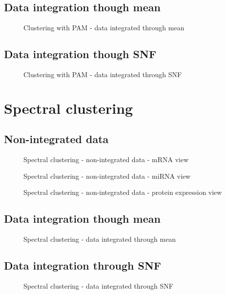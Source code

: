 \subsection{Data integration though mean}\label{pam_mean}
\begin{figure}\label{fig:pam_mean}
    \centering
    \caption{Clustering with PAM - data integrated through mean}
\end{figure}

\subsection{Data integration though SNF}\label{pam_SNF}
\begin{figure}\label{fig:pam_SNF}
    \centering
    \caption{Clustering with PAM - data integrated through SNF}
\end{figure}

\section{Spectral clustering}\label{results_sc}
\subsection{Non-integrated data}\label{sc_nonIntegrated}
\begin{figure}\label{fig:sc_1}
    \centering
    \caption{Spectral clustering - non-integrated data - mRNA view}
\end{figure}
\begin{figure}\label{fig:sc_2}
    \centering
    \caption{Spectral clustering - non-integrated data - miRNA view}
\end{figure}
\begin{figure}\label{fig:sc_3}
    \centering
    \caption{Spectral clustering - non-integrated data - protein expression view}
\end{figure}

\subsection{Data integration though mean}\label{sc_mean}
\begin{figure}\label{fig:sc_mean}
    \centering
    \caption{Spectral clustering - data integrated through mean}
\end{figure}

\subsection{Data integration through SNF}\label{sc_SNF}
\begin{figure}\label{fig:sc_SNF}
    \centering
    \caption{Spectral clustering - data integrated through SNF}
\end{figure}